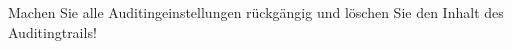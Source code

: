     \item Machen Sie alle Auditingeinstellungen r\"uckg\"angig und l\"oschen Sie den Inhalt des Auditingtrails!
